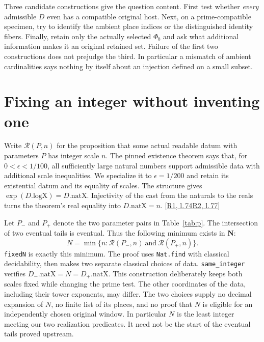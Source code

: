 \documentclass[12pt,letterpaper]{article}
\newcommand{\id}[1]{{\small\nolinkurl{#1}}}
\begin{document}
Three candidate constructions give the question content. First test whether \emph{every} admissible $D$ even has a compatible original host. Next, on a prime-compatible specimen, try to identify the ambient place indices or the distinguished identity fibers. Finally, retain only the actually selected $\Phi_b$ and ask what additional information makes it an original retained set. Failure of the first two constructions does not prejudge the third. In particular a mismatch of ambient cardinalities says nothing by itself about an injection defined on a small subset.

\section{Fixing an integer without inventing one}
Write $\mathcal R(P,n)$ for the proposition that some actual readable datum with parameters $P$ has integer scale $n$. The pinned existence theorem says that, for $0<\epsilon<1/100$, all sufficiently large natural numbers support admissible data with additional scale inequalities. We specialize it to $\epsilon=1/200$ and retain its existential datum and its equality of scales. The structure gives $\exp(D.\mathrm{logX})=D.\mathrm{natX}$. Injectivity of the cast from the naturals to the reals turns the theorem's real equality into $D.\mathrm{natX}=n$. {\footnotesize\sffamily\color{mute}[\href{https://github.com/leanprover-community/riemann-hypothesis/blob/e063a923620ee7787b4a1270421478645bf66bdb/src/New/Reduction/OneSidedBound.lean#L74}{R1, l.\,74}\enspace \href{https://github.com/leanprover-community/riemann-hypothesis/blob/e063a923620ee7787b4a1270421478645bf66bdb/src/New/Reduction/Data/AdmissibleData.lean#L77}{R2, l.\,77}]}

Let $P_-$ and $P_+$ denote the two parameter pairs in Table~\ref{tab:p}. The intersection of two eventual tails is eventual. Thus the following minimum exists in $\mathbf N$:
\[
 N=\min\{n:\mathcal R(P_-,n)\ \text{and}\ \mathcal R(P_+,n)\}.
\]
\id{fixedN} is exactly this minimum. The proof uses \id{Nat.find} with classical decidability, then makes two separate classical choices of data. \id{same_integer} verifies $D_-.\mathrm{natX}=N=D_+.\mathrm{natX}$. This construction deliberately keeps both scales fixed while changing the prime test. The other coordinates of the data, including their tower exponents, may differ. The two choices supply no decimal expansion of $N$, no finite list of its places, and no proof that $N$ is eligible for an independently chosen original window. In particular $N$ is the least integer meeting our two realization predicates. It need not be the start of the eventual tails proved upstream.
\end{document}
